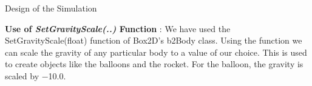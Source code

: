 \documentclass[a4paper,11pt]{resume}
\begin{document}
\begin{rSection}{{\heading Design of the Simulation}}

\begin{rSubsection}{}{}{}{}
\item \textbf{Use of \textit{SetGravityScale(..)} Function} : We have used the SetGravityScale(float) function of Box2D’s b2Body class. Using the function we can scale the gravity of any particular body to a value of our choice. This is used to create objects like the balloons and the rocket. For the balloon, the gravity is scaled by −10.0.

\end{rSubsection}

\end{rSection}
\newpage
\end{document}
